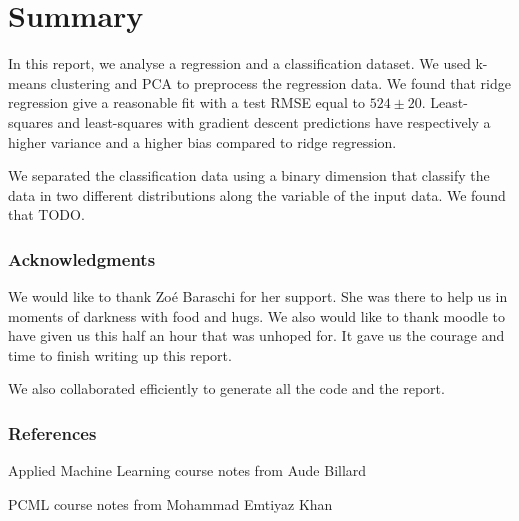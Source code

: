 \documentclass{article} %
\begin{document}
\section{Summary}
In this report, we analyse a regression and a classification dataset. We used k-means clustering and PCA to preprocess the regression data. We found that ridge regression give a reasonable fit with a test RMSE equal to $524 \pm 20$. Least-squares and least-squares with gradient descent predictions have respectively a higher variance and a higher bias compared to ridge regression.

We separated the classification data using a binary dimension that classify the data in two different distributions along the variable of the input data. We found that TODO.


\subsubsection*{Acknowledgments}
We would like to thank Zo\'e Baraschi for her support. She was there to help us in moments of darkness with food and hugs. We also would like to thank moodle to have given us this half an hour that was unhoped for. It gave us the courage and time to finish writing up this report.

We also collaborated efficiently to generate all the code and the report.

\subsubsection*{References}
Applied Machine Learning course notes from Aude Billard

PCML course notes from Mohammad Emtiyaz Khan
\end{document}
